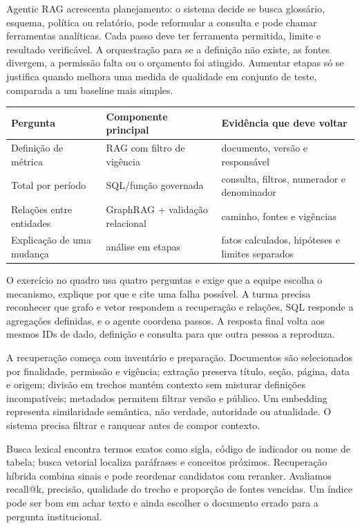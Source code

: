 Agentic RAG acrescenta planejamento: o sistema decide se busca glossário, esquema, política ou relatório, pode reformular a consulta e pode chamar ferramentas analíticas. Cada passo deve ter ferramenta permitida, limite e resultado verificável. A orquestração para se a definição não existe, as fontes divergem, a permissão falta ou o orçamento foi atingido. Aumentar etapas só se justifica quando melhora uma medida de qualidade em conjunto de teste, comparada a um baseline mais simples.

\begin{center}
\begin{tabularx}{\textwidth}{p{3.0cm}Y Y}
\toprule
Pergunta & Componente principal & Evidência que deve voltar \\
\midrule
Definição de métrica & RAG com filtro de vigência & documento, versão e responsável \\
Total por período & SQL/função governada & consulta, filtros, numerador e denominador \\
Relações entre entidades & GraphRAG + validação relacional & caminho, fontes e vigências \\
Explicação de uma mudança & análise em etapas & fatos calculados, hipóteses e limites separados \\
\bottomrule
\end{tabularx}
\end{center}

O exercício no quadro usa quatro perguntas e exige que a equipe escolha o mecanismo, explique por que e cite uma falha possível. A turma precisa reconhecer que grafo e vetor respondem a recuperação e relações, SQL responde a agregações definidas, e o agente coordena passos. A resposta final volta aos mesmos IDs de dado, definição e consulta para que outra pessoa a reproduza.

A recuperação começa com inventário e preparação. Documentos são selecionados por finalidade, permissão e vigência; extração preserva título, seção, página, data e origem; divisão em trechos mantém contexto sem misturar definições incompatíveis; metadados permitem filtrar versão e público. Um embedding representa similaridade semântica, não verdade, autoridade ou atualidade. O sistema precisa filtrar e ranquear antes de compor contexto.

Busca lexical encontra termos exatos como sigla, código de indicador ou nome de tabela; busca vetorial localiza paráfrases e conceitos próximos. Recuperação híbrida combina sinais e pode reordenar candidatos com reranker. Avaliamos recall@k, precisão, qualidade do trecho e proporção de fontes vencidas. Um índice pode ser bom em achar texto e ainda escolher o documento errado para a pergunta institucional.

